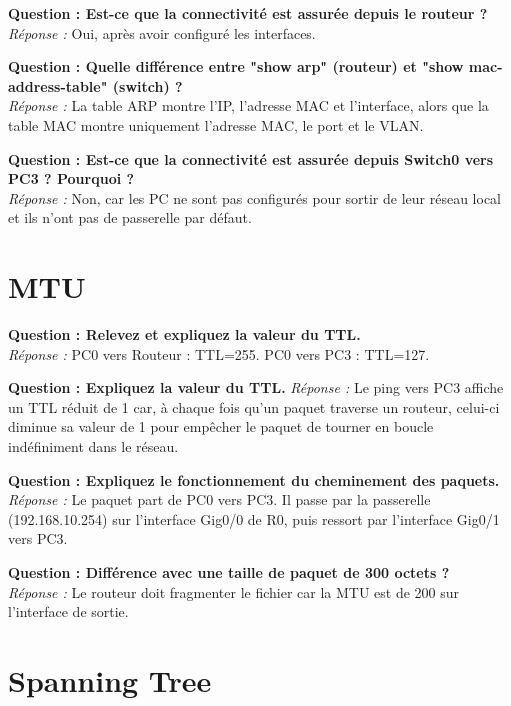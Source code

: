 \documentclass[a4paper,12pt]{article}
\begin{document}
\textbf{Question : Est-ce que la connectivité est assurée depuis le routeur ?} \\
\textit{Réponse :} Oui, après avoir configuré les interfaces.
\vspace{1em}

\textbf{Question : Quelle différence entre "show arp" (routeur) et "show mac-address-table" (switch) ?} \\
\textit{Réponse :} La table ARP montre l'IP, l'adresse MAC et l'interface, alors que la table MAC montre uniquement l'adresse MAC, le port et le VLAN.
\vspace{1em}

\textbf{Question : Est-ce que la connectivité est assurée depuis Switch0 vers PC3 ? Pourquoi ?} \\
\textit{Réponse :} Non, car les PC ne sont pas configurés pour sortir de leur réseau local et ils n'ont pas de passerelle par défaut.
\vspace{1em}

\section{MTU}

\textbf{Question : Relevez et expliquez la valeur du TTL.} \\
\textit{Réponse :} PC0 vers Routeur : TTL=255. PC0 vers PC3 : TTL=127.
\vspace{1em}

\textbf{Question : Expliquez la valeur du TTL.}
\textit{Réponse :} Le ping vers PC3 affiche un TTL réduit de 1 car, à chaque fois qu'un paquet traverse un routeur, celui-ci diminue sa valeur de 1 pour empêcher le paquet de tourner en boucle indéfiniment dans le réseau.
\vspace{1em}

\textbf{Question : Expliquez le fonctionnement du cheminement des paquets.} \\
\textit{Réponse :} Le paquet part de PC0 vers PC3. Il passe par la passerelle (192.168.10.254) sur l'interface Gig0/0 de R0, puis ressort par l'interface Gig0/1 vers PC3.
\vspace{1em}

\textbf{Question : Différence avec une taille de paquet de 300 octets ?} \\
\textit{Réponse :} Le routeur doit fragmenter le fichier car la MTU est de 200 sur l'interface de sortie.
\vspace{1em}

\section{Spanning Tree}
\end{document}
